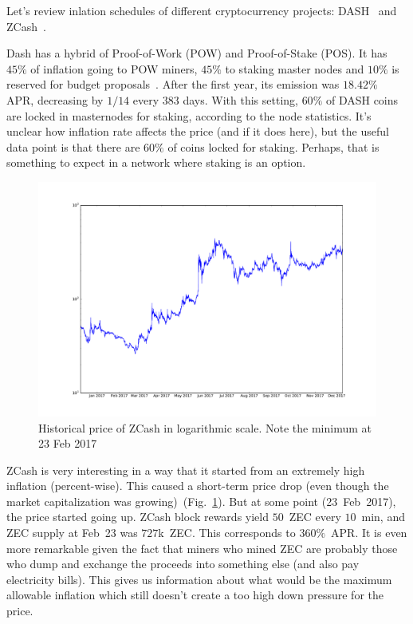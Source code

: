 \documentclass[longbibliography,nofootinbib,twocolumn]{revtex4-1}
\newcommand{\figref}[1]{Fig.~\ref{#1}}
\begin{document}
Let's review inlation schedules of different cryptocurrency projects:
DASH~\cite{dash:whitepaper} and ZCash~\cite{zcash}.

Dash has a hybrid of Proof-of-Work (POW) and Proof-of-Stake (POS).
It has $45\%$ of inflation going to POW miners, $45\%$ to staking master nodes and $10\%$ is reserved for budget proposals~\cite{dash:emission}.
After the first year, its emission was $18.42\%$ APR, decreasing by $1/14$ every $383$ days.
With this setting, $60\%$ of DASH coins are locked in masternodes for staking, according to the node statistics.
It's unclear how inflation rate affects the price (and if it does here), but the useful data point is that there are $60\%$ of coins locked for staking.
Perhaps, that is something to expect in a network where staking is an option.

\begin{figure}
    \includegraphics[width=\columnwidth]{pdf/zcash-price.pdf}
    \caption{Historical price of ZCash in logarithmic scale. Note the minimum at 23 Feb 2017}
    \label{fig:zec}
\end{figure}

ZCash is very interesting in a way that it started from an extremely high inflation (percent-wise).
This caused a short-term price drop (even though the market capitalization was growing)~(\figref{fig:zec}).
But at some point (23~Feb~2017), the price started going up.
ZCash block rewards yield $50$~ZEC every $10$~min, and ZEC supply at Feb~23 was $727$k~ZEC.
This corresponds to $360\%$~APR.
It is even more remarkable given the fact that miners who mined ZEC are probably those who dump and exchange the proceeds into something else (and also pay
electricity bills).
This gives us information about what would be the maximum allowable inflation which still doesn't create a too high down pressure for the price.
\end{document}
